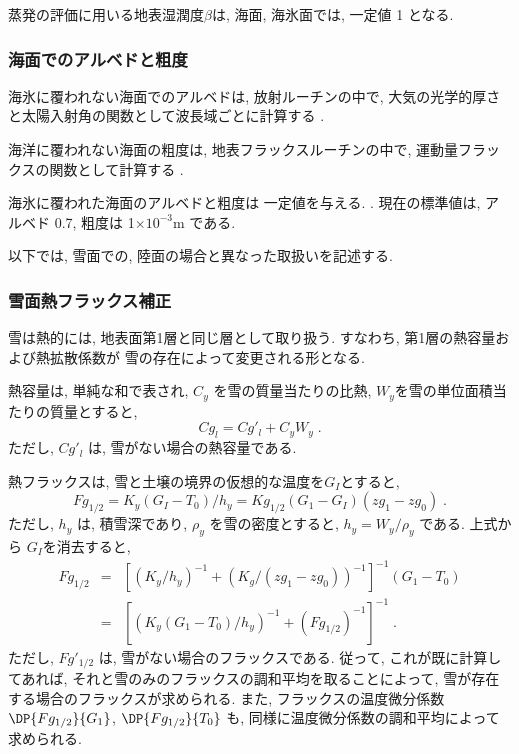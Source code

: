 蒸発の評価に用いる地表湿潤度$\beta$は,
海面, 海氷面では, 一定値 1 となる.

\subsubsection{海面でのアルベドと粗度}


海氷に覆われない海面でのアルベドは, 放射ルーチンの中で,
大気の光学的厚さと太陽入射角の関数として波長域ごとに計算する
 .

海洋に覆われない海面の粗度は, 地表フラックスルーチンの中で,
運動量フラックスの関数として計算する
 .

海氷に覆われた海面のアルベドと粗度は
一定値を与える.
.
現在の標準値は, アルベド 0.7, 
粗度は 1$\times10^{-3}$m である.

\bigskip
以下では, 雪面での, 陸面の場合と異なった取扱いを記述する.
\bigskip

\subsubsection{雪面熱フラックス補正 }


雪は熱的には, 地表面第1層と同じ層として取り扱う.
すなわち, 第1層の熱容量および熱拡散係数が
雪の存在によって変更される形となる.

熱容量は, 単純な和で表され,
$C_y$ を雪の質量当たりの比熱, $W_y$を雪の単位面積当たりの質量とすると,
\begin{equation}
  Cg_{l} = Cg'_{l} + C_y W_y \; .
\end{equation}
ただし, $Cg'_{l}$ は, 雪がない場合の熱容量である.

熱フラックスは, 雪と土壌の境界の仮想的な温度を$G_I$とすると,
\begin{equation}
  Fg_{1/2} = K_y (G_I-T_0)/h_y = Kg_{1/2} (G_1 - G_I)(zg_1 - zg_0) \; .
\end{equation}
ただし, $h_y$ は, 積雪深であり, 
$\rho_y$ を雪の密度とすると, $h_y = W_y/\rho_y$ である.
上式から $G_I$を消去すると,
\begin{eqnarray}
  Fg_{1/2} & =& \left[ \left( K_y/h_y \right)^{-1} 
                   +  \left( K_g /(zg_1 - zg_0) \right)^{-1} 
              \right]^{-1} (G_1-T_0)
                   \nonumber \\
           & =& \left[ \left( K_y (G_1-T_0)/h_y \right)^{-1} 
                    +  (Fg_{1/2})^{-1}
                \right]^{-1} \; .
\end{eqnarray}
ただし, $Fg'_{1/2}$ は, 雪がない場合のフラックスである.
従って, これが既に計算してあれば,
それと雪のみのフラックスの調和平均を取ることによって,
雪が存在する場合のフラックスが求められる.
また, フラックスの温度微分係数 $\DP{Fg_{1/2}}{G_1}$, $\DP{Fg_{1/2}}{T_0}$
も, 同様に温度微分係数の調和平均によって求められる.

